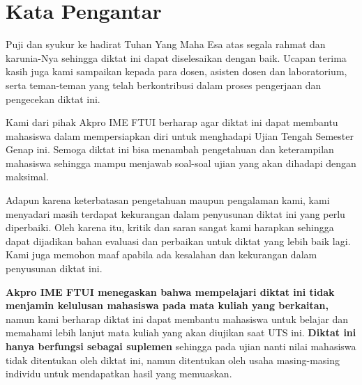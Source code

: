 \newpage
    \section{Kata Pengantar}
Puji dan syukur ke hadirat Tuhan Yang Maha Esa atas segala rahmat dan karunia-Nya sehingga diktat \namamatkul ini dapat diselesaikan dengan baik. Ucapan terima kasih juga kami sampaikan kepada para dosen, asisten dosen dan laboratorium, serta teman-teman yang telah berkontribusi dalam proses pengerjaan dan pengecekan diktat ini.
\vspace{12pt}

Kami dari pihak Akpro IME FTUI berharap agar diktat \namamatkul ini dapat membantu mahasiswa dalam mempersiapkan diri untuk menghadapi Ujian Tengah Semester Genap ini. Semoga diktat \namamatkul ini bisa menambah pengetahuan dan keterampilan mahasiswa sehingga mampu menjawab soal-soal ujian yang akan dihadapi dengan maksimal. 
\vspace{12pt}

Adapun karena keterbatasan pengetahuan maupun pengalaman kami, kami menyadari masih terdapat kekurangan dalam penyusunan diktat ini yang perlu diperbaiki. Oleh karena itu, kritik dan saran sangat kami harapkan sehingga dapat dijadikan bahan evaluasi dan perbaikan untuk diktat yang lebih baik lagi. Kami juga memohon maaf apabila ada kesalahan dan kekurangan dalam penyusunan diktat ini.
\vspace{12pt}

\textbf{Akpro IME FTUI menegaskan bahwa mempelajari diktat ini tidak menjamin kelulusan mahasiswa pada mata kuliah yang berkaitan,} namun kami berharap diktat ini dapat membantu mahasiswa untuk belajar dan memahami lebih lanjut mata kuliah yang akan diujikan saat UTS ini. \textbf{Diktat ini hanya berfungsi sebagai suplemen} sehingga pada ujian nanti nilai mahasiswa tidak ditentukan oleh diktat ini, namun ditentukan oleh usaha masing-masing individu untuk mendapatkan hasil yang memuaskan.\\
